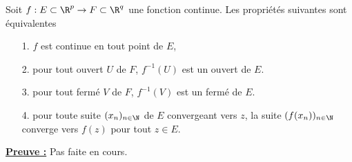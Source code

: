 \documentclass[class=report,crop=false]{standalone}
\begin{document}
\begin{theoreme}
\textcolor[rgb]{0.50,0.00,0.25}{
Soit $f:  E \subset \R^p \rightarrow F \subset \R^q$ une fonction  continue. Les
propriétés suivantes sont équivalentes
\begin{itemize}
\item[1.] $f$ est continue en tout point de  $E$,
\item[2.] pour tout ouvert  $U$ de $F$, $f^{-1}(U)$ est un ouvert de $E$.
\item[3.] pour tout fermé  $V$ de $F$, $f^{-1}(V)$ est un fermé de $E$.
\item[4.] pour toute suite $(x_n)_{n \in \N}$  de $E$ convergeant vers $z$,
la suite $(f(x_n))_{n \in \N} $ converge vers $f(z)$ pour tout $z \in E$.
\end{itemize}
}
\end{theoreme}

\noindent \underline{\bf Preuve :}
Pas faite en cours.
\end{document}
